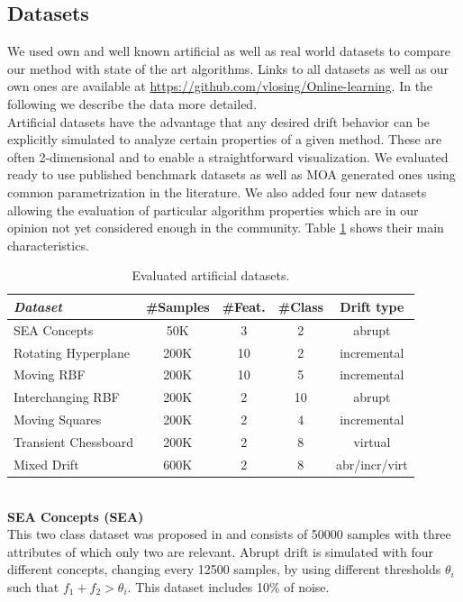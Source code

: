 \documentclass[conference]{IEEEtran}
\begin{document}
\subsection{Datasets}
We used own and well known artificial as well as real world datasets to compare our method with state of the art algorithms. 
Links to all datasets as well as our own ones are available at \url{https://github.com/vlosing/Online-learning}. In the following we describe the data more detailed.\\

Artificial datasets have the advantage that any desired drift behavior can be explicitly simulated to analyze certain properties of a given method. These are often 
2-dimensional and to enable a straightforward visualization. We evaluated ready to use published benchmark datasets as well as MOA generated ones using common parametrization in the literature.
We also added four new datasets allowing the evaluation of particular algorithm properties which are in our opinion not yet considered enough in the community. 
Table \ref{tab:artDatasets} shows their main characteristics.
\begin{table}
\caption{Evaluated artificial datasets.}
\label{tab:artDatasets}
\centering
\begin{tabular}{l|cccc}
\textit{Dataset} & \#Samples&\#Feat.&\#Class&Drift type\\\hline
SEA Concepts & 50K & 3 & 2 & abrupt\\
Rotating Hyperplane & 200K & 10 & 2 & incremental\\
Moving RBF & 200K & 10 & 5 & incremental\\
Interchanging RBF & 200K & 2 & 10 & abrupt\\
Moving Squares & 200K & 2 & 4 & incremental\\
Transient Chessboard & 200K & 2 & 8 & virtual\\
Mixed Drift & 600K & 2 & 8 & abr/incr/virt\\
\end{tabular}
\end{table}
\\\textbf{SEA Concepts (SEA)}\\
This two class dataset was proposed in \cite{Street:2001:SEA:502512.502568} and consists of 50000 samples with three attributes of which only two are relevant.
Abrupt drift is simulated with four different concepts, changing every 12500 samples, by using different thresholds $\theta_i$ such that $f_1 + f_2 > \theta_i$.
This dataset includes 10\% of noise.\\
\end{document}
